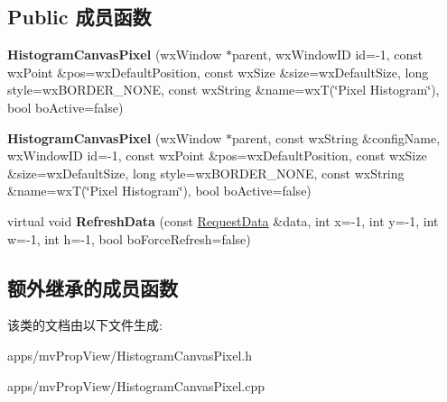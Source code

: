 \subsection*{Public 成员函数}
\begin{DoxyCompactItemize}
\item 
\hypertarget{class_histogram_canvas_pixel_a468e9d652d6b93fea45825726d7dfd04}{{\bfseries Histogram\+Canvas\+Pixel} (wx\+Window $\ast$parent, wx\+Window\+I\+D id=-\/1, const wx\+Point \&pos=wx\+Default\+Position, const wx\+Size \&size=wx\+Default\+Size, long style=wx\+B\+O\+R\+D\+E\+R\+\_\+\+N\+O\+N\+E, const wx\+String \&name=wx\+T(\char`\"{}Pixel Histogram\char`\"{}), bool bo\+Active=false)}\label{class_histogram_canvas_pixel_a468e9d652d6b93fea45825726d7dfd04}

\item 
\hypertarget{class_histogram_canvas_pixel_aba9c61f461552ccbf317cd7dbc6cb00b}{{\bfseries Histogram\+Canvas\+Pixel} (wx\+Window $\ast$parent, const wx\+String \&config\+Name, wx\+Window\+I\+D id=-\/1, const wx\+Point \&pos=wx\+Default\+Position, const wx\+Size \&size=wx\+Default\+Size, long style=wx\+B\+O\+R\+D\+E\+R\+\_\+\+N\+O\+N\+E, const wx\+String \&name=wx\+T(\char`\"{}Pixel Histogram\char`\"{}), bool bo\+Active=false)}\label{class_histogram_canvas_pixel_aba9c61f461552ccbf317cd7dbc6cb00b}

\item 
\hypertarget{class_histogram_canvas_pixel_a784ba42e2f5bd94c21eca942e8fc9a6d}{virtual void {\bfseries Refresh\+Data} (const \hyperlink{struct_request_data}{Request\+Data} \&data, int x=-\/1, int y=-\/1, int w=-\/1, int h=-\/1, bool bo\+Force\+Refresh=false)}\label{class_histogram_canvas_pixel_a784ba42e2f5bd94c21eca942e8fc9a6d}

\end{DoxyCompactItemize}
\subsection*{额外继承的成员函数}


该类的文档由以下文件生成\+:\begin{DoxyCompactItemize}
\item 
apps/mv\+Prop\+View/Histogram\+Canvas\+Pixel.\+h\item 
apps/mv\+Prop\+View/Histogram\+Canvas\+Pixel.\+cpp\end{DoxyCompactItemize}
